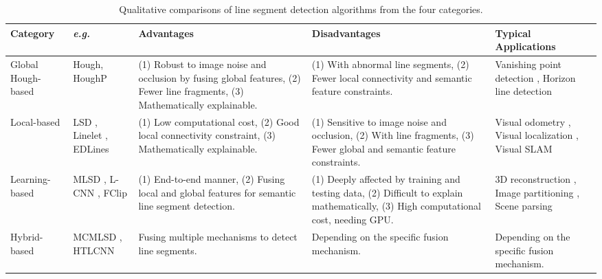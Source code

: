 \documentclass[journal,compsoc]{IEEEtran}
\begin{document}
\begin{table*}[tbp] 	
	\centering 	
	\scriptsize 	
	\caption{Qualitative comparisons of line segment detection algorithms from the four categories.}		 	\begin{tabular}{|p{}<{\centering}|p{}<{\centering}|p{}<{\centering}|p{}<{\centering}|p{}<{\centering}|}
		\hline 		Category       & \textit{e.g.} & Advantages                                                                                                                                  & Disadvantages                                                                                                                      & Typical Applications                                \\ \hline 		Global Hough-based    & Hough\cite{UseoftheHoughTransformationtoDetectLinesandCurvesinPictures}, HoughP \cite{RobustDetectionofLinesUsingtheProgressiveProbabilisticHoughTransform}         & (1) Robust to image noise and occlusion by fusing global features, (2) Fewer line fragments, (3) Mathematically explainable. & (1) With abnormal line segments, (2) Fewer local connectivity and semantic feature constraints.                    & Vanishing point detection \cite{10.1007/978-3-030-01249-6_20}, Horizon line detection \cite{10.1145/2964284.2967198} \\ \hline 		Local-based & LSD \cite{LSD}, Linelet \cite{ANovelLineletBasedRepresentationforLineSegmentDetection}, EDLines \cite{EDLines}                   & (1) Low computational cost, (2) Good local connectivity constraint, (3) Mathematically explainable.                                                  & (1) Sensitive to image noise and occlusion, (2) With line fragments, (3) Fewer global and semantic feature constraints.          & Visual odometry \cite{9521248}, Visual localization \cite{9106407}, Visual SLAM \cite{9856705} \\ \hline 		Learning-based & MLSD \cite{TowardsRealtimeandLightweightLineSegmentDetection}, L-CNN \cite{End-to-EndWireframeParsing}, FClip \cite{FullyConvolutionalLineParsing}              & (1) End-to-end manner, (2)   Fusing local and global features for semantic line segment detection.                                      & (1) Deeply affected by training and testing data, (2) Difficult to explain mathematically, (3) High computational cost, needing GPU. & 3D reconstruction \cite{LearningtoReconstruct3DManhattanWireframesFromaSingleImage}, Image partitioning \cite{7298931}, Scene parsing \cite{6619245}                   \\ \hline 		Hybrid-based    & MCMLSD \cite{MCMLSD}, HTLCNN \cite{DeepHoughTransformLinePriors}         & Fusing multiple mechanisms to detect line segments. &  Depending on the specific fusion mechanism.                   & Depending on the specific fusion mechanism. \\ \hline		 	
	\end{tabular} 	
	\label{line_segment_detection_comparsion} 
\end{table*}
\end{document}

